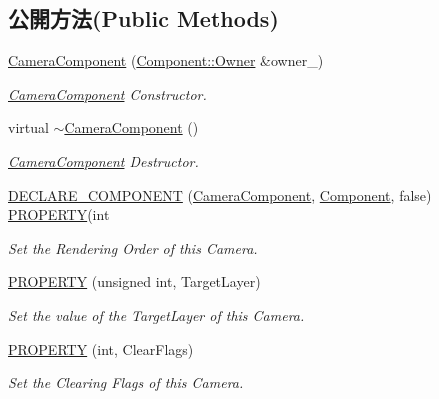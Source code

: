 \subsection*{公開方法(Public Methods)}
\begin{DoxyCompactItemize}
\item 
\hyperlink{class_magnum_1_1_camera_component_ab6a56dfe932d9ddad1df9c0ffe0a329f}{Camera\+Component} (\hyperlink{class_magnum_1_1_component_1_1_owner}{Component\+::\+Owner} \&owner\+\_\+)
\begin{DoxyCompactList}\small\item\em \hyperlink{class_magnum_1_1_camera_component}{Camera\+Component} Constructor. \end{DoxyCompactList}\item 
virtual \hyperlink{class_magnum_1_1_camera_component_a977e080c45152719c5e6335cfb0698fc}{$\sim$\+Camera\+Component} ()
\begin{DoxyCompactList}\small\item\em \hyperlink{class_magnum_1_1_camera_component}{Camera\+Component} Destructor. \end{DoxyCompactList}\item 
\hyperlink{class_magnum_1_1_camera_component_a2744b8bee88e1e7577b416147731fa31}{D\+E\+C\+L\+A\+R\+E\+\_\+\+C\+O\+M\+P\+O\+N\+E\+NT} (\hyperlink{class_magnum_1_1_camera_component}{Camera\+Component}, \hyperlink{class_magnum_1_1_component}{Component}, false)   \hyperlink{class_magnum_1_1_camera_component_a2887b0c8a70aea853e6390193c013886}{P\+R\+O\+P\+E\+R\+TY}(int
\begin{DoxyCompactList}\small\item\em Set the Rendering Order of this Camera. \end{DoxyCompactList}\item 
\hyperlink{class_magnum_1_1_camera_component_a2887b0c8a70aea853e6390193c013886}{P\+R\+O\+P\+E\+R\+TY} (unsigned int, Target\+Layer)
\begin{DoxyCompactList}\small\item\em Set the value of the Target\+Layer of this Camera. \end{DoxyCompactList}\item 
\hyperlink{class_magnum_1_1_camera_component_a4199c46f3ece9fbc167f208a7ea07c5e}{P\+R\+O\+P\+E\+R\+TY} (int, Clear\+Flags)
\begin{DoxyCompactList}\small\item\em Set the Clearing Flags of this Camera. \end{DoxyCompactList}\item 

\end{DoxyCompactItemize}
